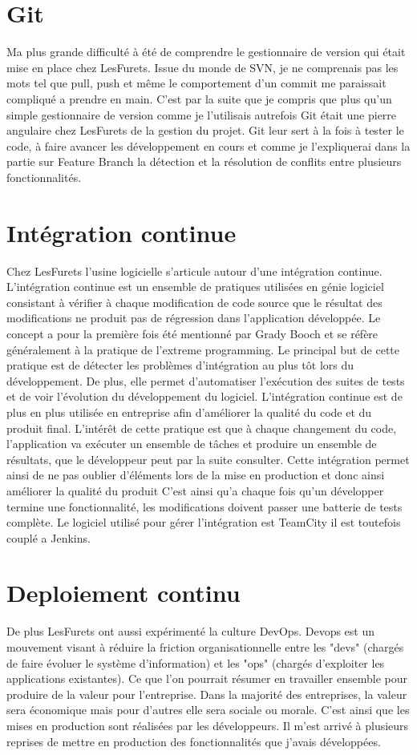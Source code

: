 \section{Git}
Ma plus grande difficulté à été de comprendre le gestionnaire de version qui était mise en place chez LesFurets. Issue du monde de SVN, je ne comprenais pas les mots tel que pull, push et même le comportement d'un commit me paraissait compliqué a prendre en main. C'est par la suite que je compris que plus qu'un simple gestionnaire de version comme je l'utilisais autrefois Git était une pierre angulaire chez LesFurets de la gestion du projet. Git leur sert à la fois à tester le code, à faire avancer les développement en cours et comme je l'expliquerai dans la partie sur Feature Branch la détection et la résolution de conflits entre plusieurs fonctionnalités.

\section{Intégration continue}
Chez LesFurets l'usine logicielle s'articule autour d'une intégration continue. L'intégration continue est un ensemble de pratiques utilisées en génie logiciel consistant à vérifier à chaque modification de code source que le résultat des modifications ne produit pas de régression dans l'application développée. Le concept a pour la première fois été mentionné par Grady Booch et se réfère généralement à la pratique de l'extreme programming. Le principal but de cette pratique est de détecter les problèmes d'intégration au plus tôt lors du développement. De plus, elle permet d'automatiser l'exécution des suites de tests et de voir l'évolution du développement du logiciel.
L'intégration continue est de plus en plus utilisée en entreprise afin d'améliorer la qualité du code et du produit final. L'intérêt de cette pratique est que à chaque changement du code, l'application va exécuter un ensemble de tâches et produire un ensemble de résultats, que le développeur peut par la suite consulter. Cette intégration permet ainsi de ne pas oublier d'éléments lors de la mise en production et donc ainsi améliorer la qualité du produit
C'est ainsi qu'a chaque fois qu'un développer termine une fonctionnalité, les modifications doivent passer une batterie de tests complète. Le logiciel utilisé pour gérer l'intégration est TeamCity il est toutefois couplé a Jenkins.

\section{Deploiement continu}
De plus LesFurets ont aussi expérimenté la culture DevOps. Devops est un mouvement visant à réduire la friction organisationnelle entre les "devs" (chargés de faire évoluer le système d'information) et les "ops" (chargés d'exploiter les applications existantes).
Ce que l'on pourrait résumer en travailler ensemble pour produire de la valeur pour l'entreprise. Dans la majorité des entreprises, la valeur sera économique mais pour d'autres elle sera sociale ou morale. C'est ainsi que les mises en production sont réalisées par les développeurs. Il m'est arrivé à plusieurs reprises de mettre en production des fonctionnalités que j'avais développées.

